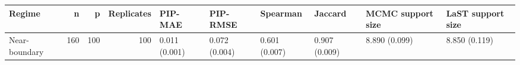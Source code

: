 \begin{tabular}{lrrrllllll}
\toprule
Regime & n & p & Replicates & PIP-MAE & PIP-RMSE & Spearman & Jaccard & MCMC support size & LaST support size \\
\midrule
Near-boundary & 160 & 100 & 100 & 0.011 (0.001) & 0.072 (0.004) & 0.601 (0.007) & 0.907 (0.009) & 8.890 (0.099) & 8.850 (0.119) \\
\bottomrule
\end{tabular}
